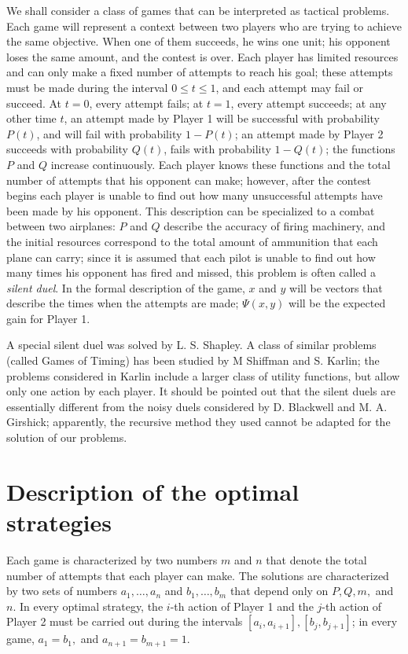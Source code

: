 \documentclass{article}
\begin{document}
We shall consider a class of games that can be interpreted as tactical
problems. Each game will represent a context between two players who are trying
to achieve the same objective. When one of them succeeds, he wins one unit; his
opponent loses the same amount, and the contest is over. Each player has
limited resources and can only make a fixed number of attempts to reach his
goal; these attempts must be made during the interval $0 \leq t \leq 1$, and
each attempt may fail or succeed. At $t=0$, every attempt fails; at $t=1$,
every attempt succeeds; at any other time $t$, an attempt made by Player 1 will
be successful with probability $P(t)$, and will fail with probability $1 -
P(t)$; an attempt made by Player 2 succeeds with probability $Q(t)$, fails with
probability $1- Q(t)$; the functions $P$ and $Q$ increase continuously. Each
player knows these functions and the total number of attempts that his opponent
can make; however, after the contest begins each player is unable to find out
how many unsuccessful attempts have been made by his opponent. This description
can be specialized to a combat between two airplanes: $P$ and $Q$ describe the
accuracy of firing machinery, and the initial resources correspond to the total
amount of ammunition that each plane can carry; since it is assumed that each
pilot is unable to find out how many times his opponent has fired and missed,
this problem is often called a \emph{silent duel}. In the formal description of
the game, $x$ and $y$ will be vectors that describe the times when the attempts
are made; $\Psi(x, y)$ will be the expected gain for Player 1.

A special silent duel was solved by L. S. Shapley. A class of similar problems
(called Games of Timing) has been studied by M Shiffman and S. Karlin; the
problems considered in Karlin include a larger class of utility functions, but
allow only one action by each player. It should be pointed out that the silent
duels are essentially different from the noisy duels considered by D. Blackwell
and M. A. Girshick; apparently, the recursive method they used cannot be
adapted for the solution of our problems.

\section{Description of the optimal strategies}

Each game is characterized by two numbers $m$ and $n$ that denote the total
number of attempts that each player can make. The solutions are characterized
by two sets of numbers $a_1, \dots, a_n$ and $b_1, \dots, b_m$ that depend only
on $P, Q, m,$ and $n$. In every optimal strategy, the $i$-th action of Player
1 and the $j$-th action of Player 2 must be carried out during the intervals
$[a_i, a_{i+1}], [b_j, b_{j+1}]$; in every game, $a_1 = b_1,$ and $a_{n+1} =
b_{m+1} = 1$.
\end{document}
